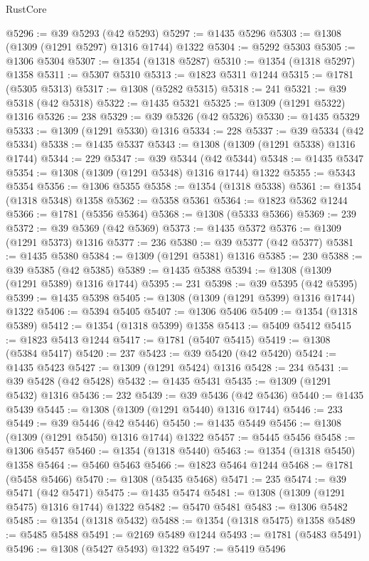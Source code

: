 \begin{lexlean}{RustCore}
\begin{coremodule}
@5296 := @39 @5293 (@42 @5293)
@5297 := @1435 @5296
@5303 := @1308 (@1309 (@1291 @5297) @1316 @1744) @1322
@5304 := @5292 @5303
@5305 := @1306 @5304
@5307 := @1354 (@1318 @5287)
@5310 := @1354 (@1318 @5297) @1358
@5311 := @5307 @5310
@5313 := @1823 @5311 @1244
@5315 := @1781 (@5305 @5313)
@5317 := @1308 (@5282 @5315)
@5318 := 241
@5321 := @39 @5318 (@42 @5318)
@5322 := @1435 @5321
@5325 := @1309 (@1291 @5322) @1316
@5326 := 238
@5329 := @39 @5326 (@42 @5326)
@5330 := @1435 @5329
@5333 := @1309 (@1291 @5330) @1316
@5334 := 228
@5337 := @39 @5334 (@42 @5334)
@5338 := @1435 @5337
@5343 := @1308 (@1309 (@1291 @5338) @1316 @1744)
@5344 := 229
@5347 := @39 @5344 (@42 @5344)
@5348 := @1435 @5347
@5354 := @1308 (@1309 (@1291 @5348) @1316 @1744) @1322
@5355 := @5343 @5354
@5356 := @1306 @5355
@5358 := @1354 (@1318 @5338)
@5361 := @1354 (@1318 @5348) @1358
@5362 := @5358 @5361
@5364 := @1823 @5362 @1244
@5366 := @1781 (@5356 @5364)
@5368 := @1308 (@5333 @5366)
@5369 := 239
@5372 := @39 @5369 (@42 @5369)
@5373 := @1435 @5372
@5376 := @1309 (@1291 @5373) @1316
@5377 := 236
@5380 := @39 @5377 (@42 @5377)
@5381 := @1435 @5380
@5384 := @1309 (@1291 @5381) @1316
@5385 := 230
@5388 := @39 @5385 (@42 @5385)
@5389 := @1435 @5388
@5394 := @1308 (@1309 (@1291 @5389) @1316 @1744)
@5395 := 231
@5398 := @39 @5395 (@42 @5395)
@5399 := @1435 @5398
@5405 := @1308 (@1309 (@1291 @5399) @1316 @1744) @1322
@5406 := @5394 @5405
@5407 := @1306 @5406
@5409 := @1354 (@1318 @5389)
@5412 := @1354 (@1318 @5399) @1358
@5413 := @5409 @5412
@5415 := @1823 @5413 @1244
@5417 := @1781 (@5407 @5415)
@5419 := @1308 (@5384 @5417)
@5420 := 237
@5423 := @39 @5420 (@42 @5420)
@5424 := @1435 @5423
@5427 := @1309 (@1291 @5424) @1316
@5428 := 234
@5431 := @39 @5428 (@42 @5428)
@5432 := @1435 @5431
@5435 := @1309 (@1291 @5432) @1316
@5436 := 232
@5439 := @39 @5436 (@42 @5436)
@5440 := @1435 @5439
@5445 := @1308 (@1309 (@1291 @5440) @1316 @1744)
@5446 := 233
@5449 := @39 @5446 (@42 @5446)
@5450 := @1435 @5449
@5456 := @1308 (@1309 (@1291 @5450) @1316 @1744) @1322
@5457 := @5445 @5456
@5458 := @1306 @5457
@5460 := @1354 (@1318 @5440)
@5463 := @1354 (@1318 @5450) @1358
@5464 := @5460 @5463
@5466 := @1823 @5464 @1244
@5468 := @1781 (@5458 @5466)
@5470 := @1308 (@5435 @5468)
@5471 := 235
@5474 := @39 @5471 (@42 @5471)
@5475 := @1435 @5474
@5481 := @1308 (@1309 (@1291 @5475) @1316 @1744) @1322
@5482 := @5470 @5481
@5483 := @1306 @5482
@5485 := @1354 (@1318 @5432)
@5488 := @1354 (@1318 @5475) @1358
@5489 := @5485 @5488
@5491 := @2169 @5489 @1244
@5493 := @1781 (@5483 @5491)
@5496 := @1308 (@5427 @5493) @1322
@5497 := @5419 @5496

\end{coremodule}
\end{lexlean}
